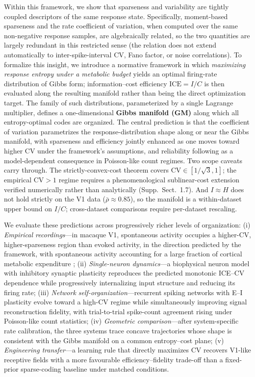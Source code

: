 \documentclass[sn-basic,Numbered]{sn-jnl}%
\theoremstyle{thmstyleone}%
\theoremstyle{thmstyletwo}%
\theoremstyle{thmstylethree}%
\begin{document}
Within this framework, we show that sparseness and variability are tightly coupled descriptors of the same response state.  Specifically, moment-based sparseness and the rate coefficient of variation, when computed over the same non-negative response samples, are algebraically related, so the two quantities are largely redundant in this restricted sense (the relation does not extend automatically to inter-spike-interval CV, Fano factor, or noise correlations). To formalize this insight, we introduce a normative framework in which \emph{maximizing response entropy under a metabolic budget} yields an optimal firing-rate distribution of Gibbs form; information--cost efficiency $\mathrm{ICE}=I/C$ is then evaluated along the resulting manifold rather than being the direct optimization target.  The family of such distributions, parameterized by a single Lagrange multiplier, defines a one-dimensional \textbf{Gibbs manifold (GM)} along which all entropy-optimal codes are organized. The central prediction is that the coefficient of variation parametrizes the response-distribution shape along or near the Gibbs manifold, with sparseness and efficiency jointly enhanced as one moves toward higher CV under the framework's assumptions, and reliability following as a model-dependent consequence in Poisson-like count regimes.  Two scope caveats carry through.  The strictly-convex-cost theorem covers $\mathrm{CV}\in[1/\sqrt{3},1]$; the empirical $\mathrm{CV}>1$ regime requires a phenomenological sublinear-cost extension verified numerically rather than analytically (Supp.~Sect.~1.7).  And $I\approx H$ does not hold strictly on the V1 data ($\bar\rho\approx 0.85$), so the manifold is a within-dataset upper bound on $I/C$; cross-dataset comparisons require per-dataset rescaling.

We evaluate these predictions across progressively richer levels of organization:
(i) \emph{Empirical recordings}---in macaque V1, spontaneous activity occupies a higher-CV, higher-sparseness region than evoked activity, in the direction predicted by the framework, with spontaneous activity accounting for a large fraction of cortical metabolic expenditure \cite{Raichle2001,Tomasi2013};
(ii) \emph{Single-neuron dynamics}---a biophysical neuron model with inhibitory synaptic plasticity reproduces the predicted monotonic ICE--CV dependence while progressively internalizing input structure and reducing its firing rate;
(iii) \emph{Network self-organization}---recurrent spiking networks with E--I plasticity evolve toward a high-CV regime while simultaneously improving signal reconstruction fidelity, with trial-to-trial spike-count agreement rising under Poisson-like count statistics;
(iv) \emph{Geometric comparison}---after system-specific rate calibration, the three systems trace concave trajectories whose shape is consistent with the Gibbs manifold on a common entropy--cost plane;
(v) \emph{Engineering transfer}---a learning rule that directly maximizes CV recovers V1-like receptive fields with a more favourable efficiency--fidelity trade-off than a fixed-prior sparse-coding baseline under matched conditions.
\end{document}
